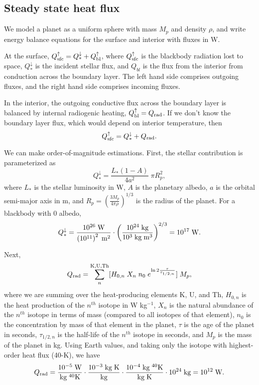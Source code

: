 \documentclass[10pt,a4paper]{article}
\begin{document}
\subsection{Steady state heat flux}

We model a planet as a uniform sphere with mass $M_p$ and density $\rho$, and write energy balance equations for the surface and interior with fluxes in W. 

At the surface, $Q_{\rm sfc}^{\uparrow} = Q_*^{\downarrow} + Q^{\uparrow}_{\rm bl}$, where $Q_{\rm sfc}^{\uparrow}$ is the blackbody radiation lost to space, $Q_*^{\downarrow}$ is the incident stellar flux, and $Q_{bl}$ is the flux from the interior from conduction across the boundary layer. The left hand side comprises outgoing fluxes, and the right hand side comprises incoming fluxes. 

In the interior, the outgoing conductive flux across the boundary layer is balanced by internal radiogenic heating, $Q^{\uparrow}_{\rm bl} = Q_{\rm rad}$. If we don't know the boundary layer flux, which would depend on interior temperature, then
\begin{equation}
Q_{\rm sfc}^{\uparrow} = Q_*^{\downarrow} + Q_{\rm rad}.
\end{equation}

We can make order-of-magnitude estimations. First, the stellar contribution is parameterized as
\begin{equation}
Q_*^{\downarrow} = \frac{L_*(1-A)}{4a^2} \; \pi R_p^2,
\end{equation}
where $L_*$ is the stellar luminosity in W, $A$ is the planetary albedo, $a$ is the orbital semi-major axis in m, and $R_p = \left(\frac{3M_p}{4 \pi \rho}\right)^{1/3}$ is the radius of the planet. For a blackbody with 0 albedo, 
\begin{equation}
Q_*^{\downarrow} = \frac{10^{26} \; {\rm W}}{\left(10^{11}\right)^2 \; \rm{m}^2} \cdot \left(\frac{10^{24}\;{\rm kg}}{10^3 \; {\rm kg}\;{\rm m}^3}\right)^{2/3} = 10^{17} \; {\rm W}.
\end{equation}


Next,
\begin{equation}
Q_{\rm rad} = \sum^{\rm K, U, Th}_n [ H_{0, n} \; X_n \; n_0 \; e^{\ln 2 \frac{\tau}{\tau_{1/2 ,n}}} ] \; M_p,
\end{equation}
where we are summing over the heat-producing elements K, U, and Th, $H_{0, n}$ is the heat production of the $n^{th}$ isotope in W kg$^{-1}$, $X_n$ is the natural abundance of the $n^{th}$ isotope in terms of mass (compared to all isotopes of that element), $n_0$ is the concentration by mass of that element in the planet, $\tau$ is the age of the planet in seconds,  $\tau_{1/2 ,n}$ is the half-life of the $n^{th}$ isotope in seconds, and $M_p$ is the mass of the planet in kg. Using Earth values, and taking only the isotope with highest-order heat flux (40-K), we have
\begin{equation}
Q_{\rm rad} = \frac{10^{-5}\;{\rm W}}{{\rm kg}\;^{40}{\rm K}} \cdot \frac{10^{-3}\;\rm{kg\;K}}{\rm kg} \cdot \frac{10^{-4}\;{\rm kg}\;^{40}{\rm K}}{\rm{kg\;K}} \cdot 10^{24} \; {\rm kg} = 10^{12} \; {\rm W}.
\end{equation}
\end{document}
